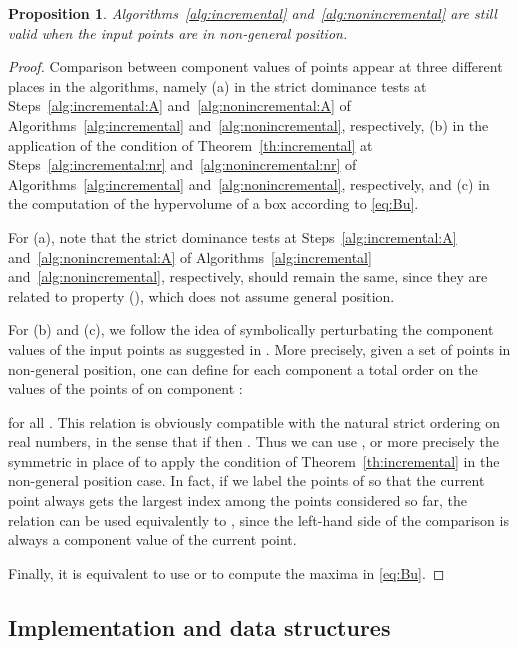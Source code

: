 \documentclass[a4paper,11pt]{article}
\newtheorem{proposition}[lemma]{Proposition}
\begin{document}
\begin{proposition}
  Algorithms~\ref{alg:incremental} and~\ref{alg:nonincremental} 
  are still valid when the input points are in non-general position.
\end{proposition}


\begin{proof}
Comparison between component values of points appear at three different places in the algorithms,
namely 
(a) in the strict dominance tests at Steps~\ref{alg:incremental:A} and~\ref{alg:nonincremental:A} 
of  Algorithms~\ref{alg:incremental} and~\ref{alg:nonincremental}, respectively,
(b) in the application of the condition of Theorem~\ref{th:incremental} at Steps~\ref{alg:incremental:nr}
and~\ref{alg:nonincremental:nr} of  Algorithms~\ref{alg:incremental} and~\ref{alg:nonincremental}, respectively, and 
(c) in the computation of the hypervolume of a box according to \eqref{eq:Bu}.

For (a), note that the strict dominance tests at Steps~\ref{alg:incremental:A}
and~\ref{alg:nonincremental:A} 
of  Algorithms~\ref{alg:incremental} and~\ref{alg:nonincremental}, respectively,
should remain the same,
since they are related to property (), which does not assume general position.

For (b) and (c), we follow the idea of symbolically perturbating 
the component values of the input points
as suggested in \citet{KapRubShaVer08}.
More precisely, given a set  of points in non-general position, 
one can define for each component  a total order  
on the values of the points of  on component :

for all .
This relation is obviously compatible with the natural strict ordering on real numbers, 
in the sense that if  then .
Thus we can use , or more precisely the symmetric  
in place of  to apply the condition of Theorem~\ref{th:incremental} in the non-general position case.
In fact, if we label the points of  so that the current point 
always gets the largest index among the points considered so far, 
the relation  can be used equivalently to , 
since the left-hand side of the comparison is always a component value of the current point.

Finally, it is equivalent to use  or  to compute the maxima in \eqref{eq:Bu}.
\end{proof}

\subsection{Implementation and data structures}\label{sub:impl}
\end{document}

